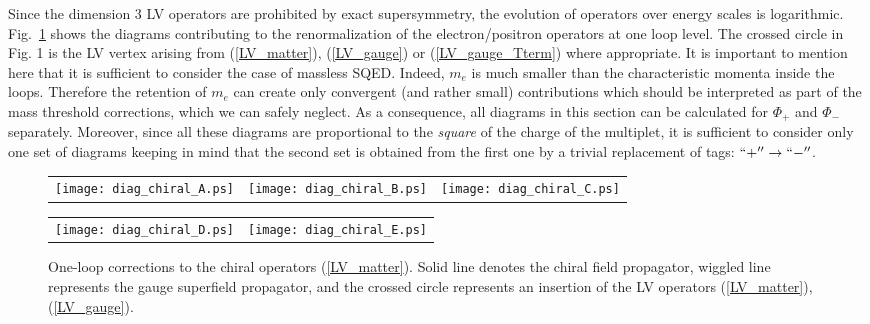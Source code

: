 \documentclass[paper,12pt]{revtex4}
\begin{document}
Since the dimension 3 LV operators are prohibited by exact supersymmetry, 
the evolution of operators over energy scales is logarithmic.  
Fig.~\ref{diag_LV_chiral}
	shows the diagrams contributing to the renormalization
	of the electron/positron operators at one loop level.
    The crossed circle in Fig. 1 is the LV vertex arising 
	from (\ref{LV_matter}), (\ref{LV_gauge}) or (\ref{LV_gauge_Tterm}) where appropriate.
     It is important to mention here that it is sufficient to
	consider the case of massless SQED.
	Indeed, $m_e$ is much smaller than the characteristic 
    momenta inside the loops. Therefore the retention of $m_e$ can create only  
    convergent (and rather small) contributions which should be interpreted as 
    part of the mass threshold corrections, which we can safely neglect. As a consequence, 
    all diagrams in this section can be calculated for $\Phi_+$ and $\Phi_-$ separately. 
	Moreover, since all these diagrams are proportional
	to the {\it square} of the charge of the multiplet,
	it is sufficient to consider only one set of diagrams keeping in 
	mind that the second set is obtained from the first one by a 
	trivial replacement of tags: $ ``+'' \to ``-'' $. 
\begin{figure}[h]
\caption{\label{diag_LV_chiral}
        One-loop corrections to the
	chiral operators (\ref{LV_matter}). 
	Solid line denotes the chiral field propagator, wiggled line
	represents the gauge superfield propagator, and the crossed circle
	represents an insertion of the LV operators
	(\ref{LV_matter}), (\ref{LV_gauge}).
}
\begin{center}
\begin{tabular}{ccc}
\texttt{[image: diag\_chiral\_A.ps]}
&
\texttt{[image: diag\_chiral\_B.ps]}
&
\texttt{[image: diag\_chiral\_C.ps]} 
\end{tabular}

\begin{tabular}{rl}
\texttt{[image: diag\_chiral\_D.ps]}
&
\texttt{[image: diag\_chiral\_E.ps]}
\end{tabular}
\end{center}
\end{figure}
\end{document}
